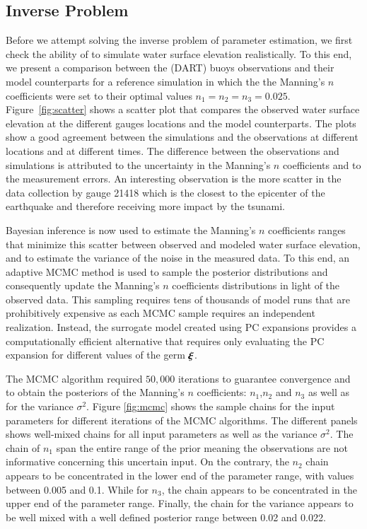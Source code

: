 \subsection{Inverse Problem} 
\label{sec:inverse}

Before we attempt solving the inverse problem of parameter estimation, 
we first check the ability of \geoclaw to simulate water surface elevation
realistically. To this end, we present a comparison between the 
(DART) buoys observations  and their \geoclaw model counterparts
for a reference simulation in which the  the Manning's $n$ coefficients were set to their optimal values $n_1=n_2=n_3=0.025$. Figure~\ref{fig:scatter} 
shows a scatter plot that compares the observed 
water surface elevation at the different gauges locations and the  \geoclaw model counterparts. 
The plots show a good agreement between the simulations and the 
observations at different locations and at different times. 
The difference between the observations and simulations is attributed to the uncertainty in the 
Manning's $n$ coefficients and to the measurement errors.
\alert{An interesting observation is the more scatter in the data collection by gauge 21418 which is the closest to
the epicenter of the earthquake and therefore receiving more impact by the tsunami.}

Bayesian inference is now used to estimate the Manning's 
$n$ coefficients ranges that minimize this scatter between 
observed and modeled water surface elevation, and to estimate the variance of the noise in the measured data.
To this end, an adaptive MCMC method is used to sample 
the posterior distributions \citep{Gareth2009,Haario2001} and consequently 
update the Manning's $n$ coefficients distributions in light of the 
observed data. This sampling requires tens of thousands of 
\geoclaw model runs that are prohibitively expensive as each MCMC 
sample requires an independent \geoclaw realization. Instead,
the surrogate model created using PC expansions provides a computationally
efficient alternative that requires only evaluating the PC expansion
for different values of the germ $\xxi$.

The MCMC algorithm required $50,000$ iterations to guarantee convergence
and to obtain the posteriors of the Manning's $n$ coefficients: 
$n_1$,$n_2$ and $n_3$ as well as for the variance $\sigma^2$. Figure \ref{fig:mcmc} 
shows the sample chains for the input parameters for different iterations of the MCMC algorithms. 
The different panels shows well-mixed chains for all input parameters as well as the variance $\sigma^2$.
The chain of  $n_{1}$ span the entire range of the prior meaning the observations are not informative 
concerning this uncertain input.  On the contrary, the $n_{2}$ chain appears to be concentrated in the 
lower end of the parameter range, with values between 0.005 and 0.1. 
While for $n_{3}$, the chain appears to be concentrated in the 
upper end of the parameter range. Finally, the chain for the variance 
appears to be well mixed with a well defined posterior range between 0.02 and 0.022.


